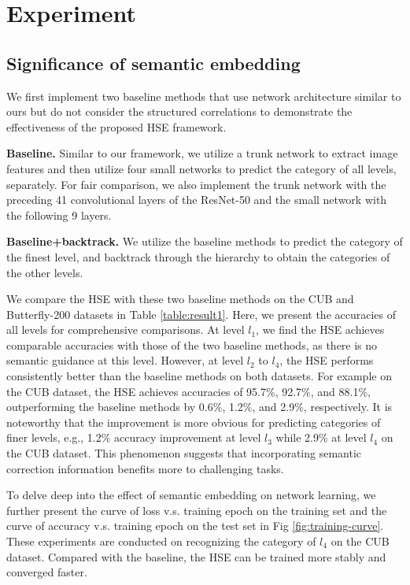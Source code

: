 \documentclass[sigconf]{acmart}
\begin{document}
\section{Experiment}

\subsection{Significance of semantic embedding}
We first implement two baseline methods that use network architecture similar to ours but do not consider the structured correlations to demonstrate the effectiveness of the proposed HSE framework. 

\noindent\textbf{Baseline. }Similar to our framework, we utilize a trunk network to extract image features and then utilize four small networks to predict the category of all levels, separately. For fair comparison, we also implement the trunk network with the preceding 41 convolutional layers of the ResNet-50 and the small network with the following 9 layers.

\noindent\textbf{Baseline+backtrack. }We utilize the baseline methods to predict the category of the finest level, and backtrack through the hierarchy to obtain the categories of the other levels. 

We compare the HSE with these two baseline methods on the CUB and Butterfly-200 datasets in Table \ref{table:result1}. Here, we present the accuracies of all levels for comprehensive comparisons. At level $l_1$, we find the HSE achieves comparable accuracies with those of the two baseline methods, as there is no semantic guidance at this level. However, at level $l_2$ to $l_4$, the HSE performs consistently better than the baseline methods on both datasets. For example on the CUB dataset, the HSE achieves accuracies of 95.7\%, 92.7\%, and 88.1\%, outperforming the baseline methods by 0.6\%, 1.2\%, and 2.9\%, respectively. It is noteworthy that the improvement is more obvious for predicting categories of finer levels, e.g., 1.2\% accuracy improvement at level $l_3$ while 2.9\% at level $l_4$ on the CUB dataset. This phenomenon suggests that incorporating semantic correction information benefits more to challenging tasks.

To delve deep into the effect of semantic embedding on network learning, we further present the curve of loss v.s. training epoch on the training set and the curve of accuracy v.s. training epoch on the test set in Fig \ref{fig:training-curve}. These experiments are conducted on recognizing the category of $l_4$ on the CUB dataset. Compared with the baseline, the HSE can be trained more stably and converged faster.
\end{document}
